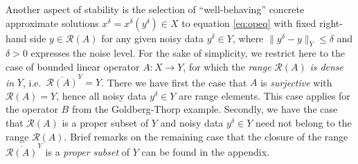 \documentclass[12pt,twoside,reqno]{amsart}
\theoremstyle{definition}
\numberwithin{equation}{section}
\begin{document}
Another aspect of stability is the selection of ``well-behaving'' concrete approximate solutions $x^\delta=x^\delta(y^\delta) \in X$ to equation \eqref{eq:opeq} with fixed right-hand side $y \in \mathcal{R}(A)$ for any given noisy data $y^\delta \in Y$, where $\|y^\delta-y\|_Y \le \delta$ and $\delta>0$ expresses the noise level. For the sake of simplicity, we restrict here to the case of bounded linear operator $A: X \to Y$, for which the \emph{range} $\mathcal{R}(A)$  \emph{is dense in} $Y$, i.e.~$\overline{\mathcal{R}(A)}^Y=Y$. There we have first the case that $A$ is \emph{surjective} with $\mathcal{R}(A)=Y$, hence all noisy data $y^\delta \in Y$ are range elements. This case applies for the operator $B$ from the Goldberg-Thorp example.
Secondly, we have the case that $\mathcal{R}(A)$ is a proper subset of $Y$ and noisy data $y^\delta \in Y$ need not belong to the range $\mathcal{R}(A)$.
Brief remarks on the remaining case that the closure of the range  $\overline{\mathcal{R}(A)}^Y$ is a \emph{proper subset} of $Y$ can be found in the appendix.
\end{document}
